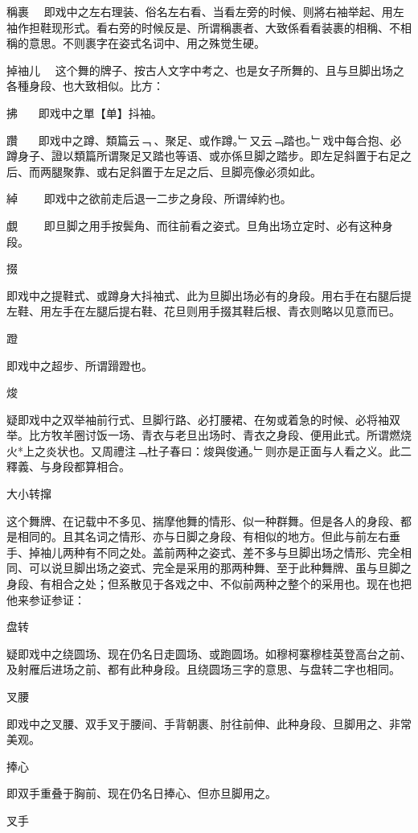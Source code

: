 \documentclass{zhvt-classic}
\begin{document}
稱裹
~~即戏中之左右理装、俗名左右看、当看左旁的时候、则將右袖举起、用左袖作担鞋现形式。看右旁的时候反是、所谓稱裹者、大致係看看装裹的相稱、不相稱的意思。不则裹字在姿式名词中、用之殊觉生硬。

掉䄂儿
~~这个舞的牌子、按古人文字中考之、也是女子所舞的、且与旦脚出场之各種身段、也大致相似。比方：

拂
~~~即戏中之單【单】抖袖。

躦
~~~即戏中之蹲、類篇云﹁𧿙、聚足、或作蹲。﹂又云﹁踏也。﹂戏中每合抱、必蹲身子、證以類篇所谓聚足又踏也等语、或亦係旦脚之踏步。即左足斜置于右足之后、而两腿聚靠、或右足斜置于左足之后、旦脚亮像必须如此。

綽
~~~~即戏中之欲前走后退一二步之身段、所谓绰約也。

覷
~~~~即旦脚之用手按鬓角、而往前看之姿式。旦角出场立定时、必有这种身段。

  掇

即戏中之提鞋式、或蹲身大抖袖式、此为旦脚出场必有的身段。用右手在右腿后提左鞋、用左手在左腿后提右鞋、花旦则用手掇其鞋后根、青衣则略以见意而已。

  蹬

即戏中之超步、所谓𨃴蹬也。

  焌

疑即戏中之双举袖前行式、旦脚行路、必打腰裙、在匆或着急的时候、必将袖双举。比方牧羊圈讨饭一场、青衣与老旦出场时、青衣之身段、便用此式。所谓燃烧火*上之炎状也。又周禮注﹁杜子春曰：焌與俊通。﹂则亦是正面与人看之义。此二釋義、与身段都算相合。

大小转撺

这个舞牌、在记载中不多见、揣摩他舞的情形、似一种群舞。但是各人的身段、都是相同的。且其名词之情形、亦与日脚之身段、有相似的地方。但此与前左右垂手、掉袖儿两种有不同之处。盖前两种之姿式、差不多与旦脚出场之情形、完全相同、可以说旦脚出场之姿式、完全是采用的那两种舞、至于此种舞牌、虽与旦脚之身段、有相合之处；但系散见于各戏之中、不似前两种之整个的采用也。现在也把他来参证参证：

  盘转

疑即戏中之绕圆场、现在仍名日走圆场、或跑圆场。如穆柯寨穆桂英登高台之前、及射雁后进场之前、都有此种身段。且绕圆场三字的意思、与盘转二字也相同。

  叉腰

即戏中之叉腰、双手叉于腰间、手背朝裹、肘往前伸、此种身段、旦脚用之、非常美观。

  捧心

即双手重叠于胸前、现在仍名日捧心、但亦旦脚用之。

  叉手
\end{document}
